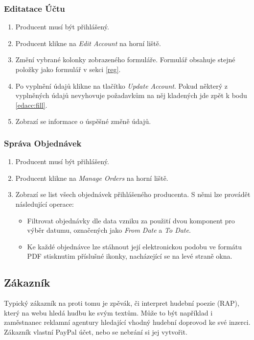 \documentclass[12pt]{article}
\begin{document}
\subsubsection{Editatace Účtu}
\begin{enumerate}
\item Producent musí být přihlášený.
\item Producent klikne na \emph{Edit Account} na horní liště.
\item \label{edacc:fill} Změní vybrané kolonky zobrazeného formuláře. Formulář obsahuje stejné položky jako formulář v sekci \ref{reg}.
\item Po vyplnění údajů klikne na tlačítko \emph{Update Account}. Pokud některý z vyplněných údajů nevyhovuje požadavkům na něj kladených jde zpět k bodu \ref{edacc:fill}.
\item Zobrazí se informace o úspěšné změně údajů.
\end{enumerate}

\subsubsection{Správa Objednávek}
\begin{enumerate}
\item Producent musí být přihlášený.
\item Producent klikne na \emph{Manage Orders} na horní liště.
\item Zobrazí se list všech objednávek přihlášeného producenta. S němi lze provádět následující operace:

  \begin{itemize}
  \item Filtrovat objednávky dle data vzniku za použití dvou komponent pro výběr datumu, označených jako \emph{From Date} a \emph{To Date}.
  \item Ke každé objednávce lze stáhnout její elektronickou podobu ve formátu PDF stisknutim příslušné ikonky, nacházející se na levé straně okna.
  \end{itemize}
  
\end{enumerate}


\subsection{Zákazník}

Typický zákazník na proti tomu je zpěvák, či interpret hudební poezie (RAP), který na webu hledá hudbu ke svým textům. Může to být například i zaměstnanec reklamní agentury hledající vhodný hudební doprovod ke své inzerci.
Zákazník vlastní PayPal účet, nebo se nebrání si jej vytvořit.
\end{document}
